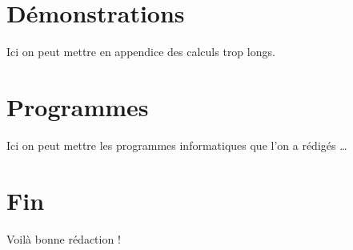 \documentclass[11pt]{article}
\theoremstyle{remark}
\theoremstyle{definition}
\begin{document}
\section{Démonstrations }
Ici on peut mettre en appendice des calculs trop longs.
\section{Programmes}
Ici on peut mettre les programmes informatiques que l'on a rédigés \ldots
\section{Fin}
Voilà bonne rédaction !







\newpage
\end{document}
